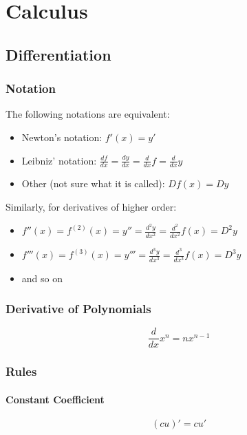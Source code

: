 \documentclass[../main.tex]{subfiles}
\begin{document}
\section{Calculus}

\subsection{Differentiation}

\subsubsection{Notation}

The following notations are equivalent:

\begin{itemize}
  \item Newton's notation: $f'(x) = y'$
  \item Leibniz' notation: $\frac{df}{dx} = \frac{dy}{dx} = \frac{d}{dx}f = \frac{d}{dx}y$
  \item Other (not sure what it is called): $Df(x) = Dy$
\end{itemize}

Similarly, for derivatives of higher order:

\begin{itemize}
  \item $f''(x) = f^{(2)}(x) = y'' = \frac{d^2y}{dx^2} = \frac{d^2}{dx^2}f(x) = D^2y$
  \item $f'''(x) = f^{(3)}(x) = y''' = \frac{d^3y}{dx^3} = \frac{d^3}{dx^3}f(x) = D^3y$
  \item and so on
\end{itemize}

\subsubsection{Derivative of Polynomials}

$$
  \frac{d}{dx}x^n = nx^{n-1}
$$

\subsubsection{Rules}

\paragraph{Constant Coefficient}

$$
  (cu)' = cu'
$$
\end{document}
